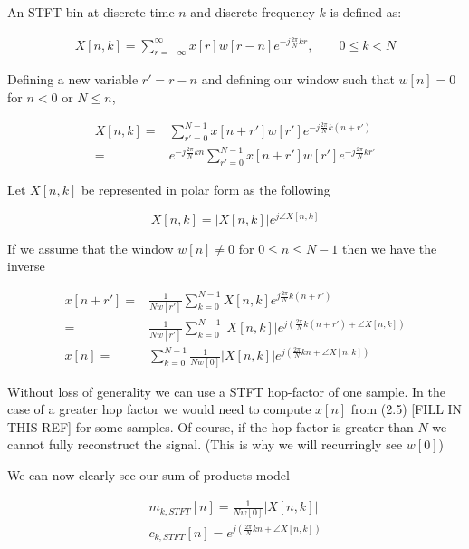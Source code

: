 \documentclass [11pt, proquest] {uwthesis}[2015/03/03]
\begin{document}
An STFT bin at discrete time $n$ and discrete frequency $k$ is defined as:

\begin{align}
\label{eq:STFTdefinition}
X[n,k] = \sum\limits_{r=-\infty}^{\infty} x[r] w[r - n] e^{-j\frac{2\pi}{N}kr}, \qquad 0 \leq k < N
\end{align}

Defining a new variable $r' = r - n$ and defining our window such that  $w[n] = 0$ for $n < 0$ or $N \leq n$,

\begin{align}
X[n,k] =& \sum\limits_{r'=0}^{N-1} x[n + r'] w[r'] e^{-j\frac{2\pi}{N}k(n + r')} \nonumber \\
=& e^{-j\frac{2\pi}{N}kn} \sum\limits_{r'=0}^{N-1} x[n + r'] w[r'] e^{-j\frac{2\pi}{N}kr'}
\end{align}

Let $X[n,k]$ be represented in polar form as the following

\begin{equation}
X[n,k] = \vert X[n,k]\vert e^{j\angle X[n,k]}
\end{equation}

If we assume that the window $w[n] \neq 0$ for $0 \leq n \leq N-1$ then we have the inverse

\begin{align}
x[n + r'] =& \frac{1}{Nw[r']}  \sum\limits_{k=0}^{N-1} X[n,k] e^{j\frac{2\pi}{N}k(n+r')} \nonumber \\
=& \frac{1}{Nw[r']}  \sum\limits_{k=0}^{N-1} \vert X[n,k]\vert e^{j(\frac{2\pi}{N}k(n+r') + \angle X[n,k])} \\
x[n] =&\sum\limits_{k=0}^{N-1}  \frac{1}{Nw[0]}  \vert X[n,k]\vert e^{j(\frac{2\pi}{N}kn + \angle X[n,k])}
\end{align}

Without loss of generality we can use a STFT hop-factor of one sample.  In the case of a greater hop factor we would need to compute $x[n]$ from (2.5) [FILL IN THIS REF] for some samples.  Of course, if the hop factor is greater than $N$ we cannot fully reconstruct the signal.  (This is why we will recurringly see $w[0]$)

We can now clearly see our sum-of-products model

\begin{align}
\label{eq:envelope_STFT}
m_{k,STFT}[n] =  \frac{1}{Nw[0]}  \vert X[n,k]\vert \\
c_{k,STFT}[n] = e^{j(\frac{2\pi}{N}kn + \angle X[n,k])}
\end{align}
\end{document}
